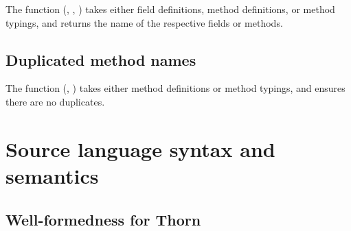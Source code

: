 \documentclass[acmlarge, anonymous, authordraft, review]{acmart} %
\begin{document}
The  function (, , ) takes either field definitions, method definitions, or 
method typings, and returns the name of the respective fields or methods.

\subsection{Duplicated method names}

The  function (, ) takes either
method definitions or method typings, and ensures there are no duplicates.

\section{Source language syntax and semantics}


\subsection*{Well-formedness for Thorn}
\end{document}
